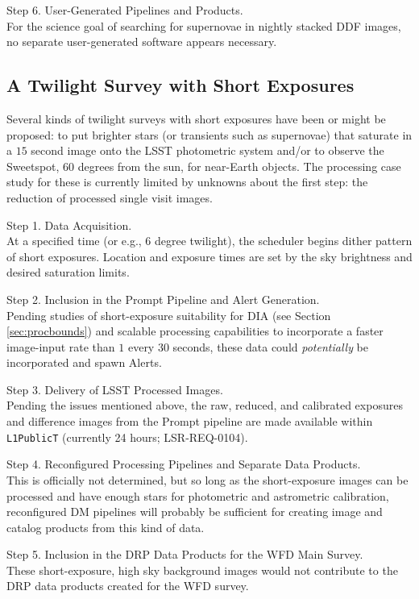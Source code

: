 \documentclass[DM,lsstdoc,toc]{lsstdoc}
\begin{document}
Step 6. User-Generated Pipelines and Products. \\
For the science goal of searching for supernovae in nightly stacked DDF images, no separate user-generated software appears necessary.


\subsection{A Twilight Survey with Short Exposures}\label{ssec:SPCS_Twilight}

Several kinds of twilight surveys with short exposures have been or might be proposed: to put brighter stars (or transients such as supernovae) that saturate in a $15$ second image onto the LSST photometric system and/or to observe the Sweetspot, 60 degrees from the sun, for near-Earth objects. The processing case study for these is currently limited by unknowns about the first step: the reduction of processed single visit images.

Step 1. Data Acquisition. \\
At a specified time (or e.g., 6 degree twilight), the scheduler begins dither pattern of short exposures. Location and exposure times are set by the sky brightness and desired saturation limits.

Step 2. Inclusion in the Prompt Pipeline and Alert Generation. \\
Pending studies of short-exposure suitability for DIA (see Section \ref{sec:procbounds}) and scalable processing capabilities to incorporate a faster image-input rate than $1$ every $30$ seconds, these data could {\it potentially} be incorporated and spawn Alerts.

Step 3. Delivery of LSST Processed Images. \\
Pending the issues mentioned above, the raw, reduced, and calibrated exposures and difference images from the Prompt pipeline are made available within  \texttt{L1PublicT} (currently 24 hours; LSR-REQ-0104).

Step 4. Reconfigured Processing Pipelines and Separate Data Products. \\
This is officially not determined, but so long as the short-exposure images can be processed and have enough stars for photometric and astrometric calibration, reconfigured DM pipelines will probably be sufficient for creating image and catalog products from this kind of data.

Step 5. Inclusion in the DRP Data Products for the WFD Main Survey. \\
These short-exposure, high sky background images would not contribute to the DRP data products created for the WFD survey.
\end{document}
